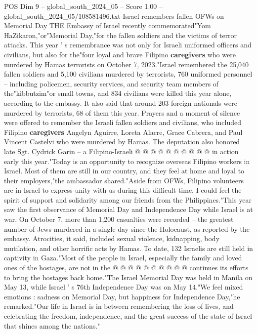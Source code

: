 \begin{textsample}{POS Dim 9 – global\_south\_2024\_05 – Score 1.00 – global\_south\_2024\_05/108581496.txt}  \label{ex:f9_pos_126}
Israel remembers fallen OFWs on Memorial Day THE Embassy of Israel recently commemorated"Yom HaZikaron,"or"Memorial Day,"for the fallen soldiers and the victims of terror attacks.
This year ' s remembrance was not only for Israeli uniformed officers and civilians, but also for the"four loyal and brave Filipino \textbf{caregivers} who were murdered by Hamas terrorists on October 7, 2023."Israel remembered the 25,040 fallen soldiers and 5,100 civilians murdered by terrorists, 760 uniformed personnel -- including policemen, security services, and security team members of the"kibbutzim"or small towns, and 834 civilians were killed this year alone, according to the embassy.
It also said that around 203 foreign nationals were murdered by terrorists, 68 of them this year.
Prayers and a moment of silence were offered to remember the Israeli fallen soldiers and civilians, who included Filipino \textbf{caregivers} Angelyn Aguirre, Loreta Alacre, Grace Cabrera, and Paul Vincent Castelvi who were murdered by Hamas.
The deputation also honored late Sgt.
Cydrick Garin -- a Filipino-Israeli @ @ @ @ @ @ @ @ @ @ in action early this year."Today is an opportunity to recognize overseas Filipino workers in Israel.
Most of them are still in our country, and they feel at home and loyal to their employers,"the ambassador shared."Aside from OFWs, Filipino volunteers are in Israel to express unity with us during this difficult time.
I could feel the spirit of support and solidarity among our friends from the Philippines."This year saw the first observance of Memorial Day and Independence Day while Israel is at war.
On October 7, more than 1,200 casualties were recorded -- the greatest number of Jews murdered in a single day since the Holocaust, as reported by the embassy.
Atrocities, it said, included sexual violence, kidnapping, body mutilation, and other horrific acts by Hamas.
To date, 132 Israelis are still held in captivity in Gaza."Most of the people in Israel, especially the family and loved ones of the hostages, are not in the @ @ @ @ @ @ @ @ @ @ continues its efforts to bring the hostages back home."The Israel Memorial Day was held in Manila on May 13, while Israel ' s 76th Independence Day was on May 14."We feel mixed emotions : sadness on Memorial Day, but happiness for Independence Day,"he remarked."Our life in Israel is in between remembering the loss of lives, and celebrating the freedom, independence, and the great success of the state of Israel that shines among the nations."

\end{textsample}
